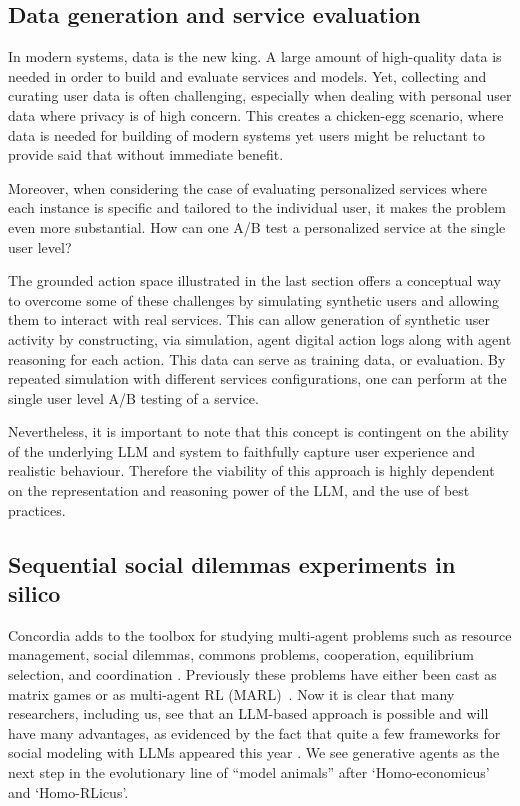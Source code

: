 \documentclass[11pt, a4paper, logo, twocolumn, internal, copyright, numbering]{googledeepmind}
\begin{document}
\subsection{Data generation and service evaluation}
In modern systems, data is the new king. A large amount of high-quality data is needed in order to build and evaluate services and models. Yet, collecting and curating user data is often challenging, especially when dealing with personal user data where privacy is of high concern. This creates a chicken-egg scenario, where data is needed for building of modern systems yet users might be reluctant to  provide said that without immediate benefit.

Moreover, when considering the case of evaluating personalized services where each instance is specific and tailored to the individual user, it makes the problem even more substantial. How can one A/B test a personalized service at the single user level? 

The grounded action space illustrated in the last section offers a conceptual way to overcome some of these challenges by simulating synthetic users and allowing them to interact with real services. This can allow generation of synthetic user activity by constructing, via simulation, agent digital action logs along with agent reasoning for each action. This data can serve as training data, or evaluation. By repeated simulation with different services configurations, one can perform at the single user level A/B testing of a service.

Nevertheless, it is important to note that this concept is contingent on the ability of the underlying LLM and system to faithfully capture user experience and realistic behaviour. Therefore the viability of this approach is highly dependent on the representation and reasoning power of the LLM, and the use of best practices.


\subsection{Sequential social dilemmas experiments in silico}

Concordia adds to the toolbox for studying multi-agent problems such as resource management, social dilemmas, commons problems, cooperation, equilibrium selection, and coordination \citep{leibo2017multi, leibo2021meltingpot}. Previously these problems have either been cast as matrix games or as multi-agent RL (MARL)~\citep{hertz2023beyond}. Now it is clear that many researchers, including us, see that an LLM-based approach is possible and will have many advantages, as evidenced by the fact that quite a few frameworks for social modeling with LLMs appeared this year \citep{wu2023chatarena, zhou2023sotopia, kaiya2023lyfe}. We see generative agents as the next step in the evolutionary line of ``model animals'' after `Homo-economicus' and `Homo-RLicus'.
\end{document}

